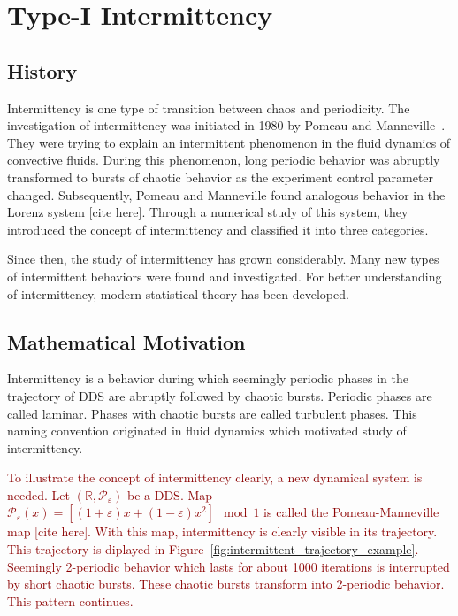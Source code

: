 \section{Type-I Intermittency}
\label{sec:type-I intermittency}

\subsection{History}
Intermittency is one type of transition between chaos and periodicity.
The investigation of intermittency was initiated in 1980 by Pomeau and Manneville~\cite{Pomeau1980}.
They were trying to explain an intermittent phenomenon in the fluid dynamics of convective fluids.
During this phenomenon, long periodic behavior was abruptly transformed to bursts of chaotic behavior as the experiment control parameter changed.
Subsequently, Pomeau and Manneville found analogous behavior in the Lorenz system [cite here].
Through a numerical study of this system, they introduced the concept of intermittency and classified it into three categories.~\cite{Pomeau1980}
\par
Since then, the study of intermittency has grown considerably.
Many new types of intermittent behaviors were found and investigated.
For better understanding of intermittency, modern statistical theory has been developed.
~\cite{Elaskar2017}

\subsection{Mathematical Motivation}
Intermittency is a behavior during which seemingly periodic phases in the trajectory of DDS are abruptly followed by chaotic bursts.
Periodic phases are called laminar.
Phases with chaotic bursts are called turbulent phases.
This naming convention originated in fluid dynamics which motivated study of intermittency.~\cite{Pomeau1980}
\par
\textcolor{darkred}{
To illustrate the concept of intermittency clearly, a new dynamical system is needed.
Let $(\mathbb{R}, \mathcal{P}_{\varepsilon})$ be a DDS.
Map $\mathcal{P}_{\varepsilon}(x) = \left[ (1+\varepsilon)x+(1-\varepsilon)x^2 \right] \mod{1}$ is called the Pomeau-Manneville map [cite here].
With this map, intermittency is clearly visible in its trajectory.
This trajectory is diplayed in Figure~\ref{fig:intermittent_trajectory_example}.
Seemingly 2-periodic behavior which lasts for about 1000 iterations is interrupted by short chaotic bursts.
These chaotic bursts transform into 2-periodic behavior.
This pattern continues.
}

